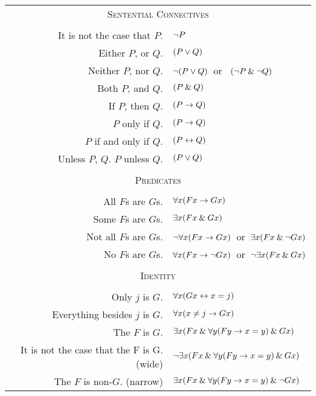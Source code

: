\begin{center}
\label{app.symbolization}
\begin{tabular*}{\textwidth}{rl}
\multicolumn{2}{c}{\textsc{Sentential Connectives}}\\ \\
It is not the case that $P$. & ${\neg} P$\\
Either $P$, or $Q$. & $(P \vee Q)$\\
Neither $P$, nor $Q$. & ${\neg}(P \vee Q)$\ or \ $({\neg} P \mathbin{\&} {\neg} Q)$\\
Both $P$, and $Q$. & $(P \mathbin{\&} Q)$\\
If $P$, then $Q$. & $(P \rightarrow Q)$\\
$P$ only if $Q$. & $(P \rightarrow Q)$\\
$P$ if and only if $Q$. & $(P \leftrightarrow Q)$\\
Unless $P$, $Q$. $P$ unless $Q$. & $(P \vee Q)$\\
\\
\multicolumn{2}{c}{\label{SymbolizingPredicates}\textsc{Predicates}}\\ \\
All $F$s are $G$s. & $\forall x(Fx \rightarrow Gx)$\\
Some $F$s are $G$s. & $\exists x(Fx \mathbin{\&} Gx)$\\
Not all $F$s are $G$s. & ${\neg}\forall x(Fx \rightarrow Gx)$\ or\ $\exists x(Fx \mathbin{\&} {\neg} Gx)$\\
No $F$s are $G$s. & $\forall x(Fx \rightarrow{\neg} Gx)$\ or\ ${\neg}\exists x(Fx \mathbin{\&} Gx)$\\
\\
\multicolumn{2}{c}{\textsc{Identity}}\\ \\
Only $j$ is $G$. & $\forall x(Gx \leftrightarrow x=j)$\\
Everything besides $j$ is $G$. & $\forall x(x \neq j \rightarrow Gx)$\\
The $F$ is $G$. & $\exists x(Fx \mathbin{\&} \forall y(Fy \rightarrow x=y) \mathbin{\&} Gx)$\\

It is not the case that the F is G. (wide)& ${\neg}\exists x(Fx \mathbin{\&} \forall y(Fy \rightarrow x=y) \mathbin{\&} Gx)$\\
The $F$ is non-$G$. (narrow) & $\exists x(Fx \mathbin{\&} \forall y(Fy \rightarrow x=y) \mathbin{\&} {\neg} Gx)$
\end{tabular*}
\end{center}



